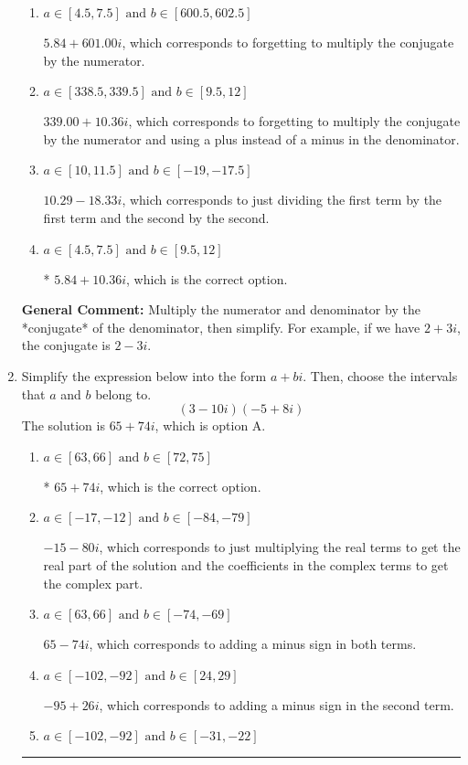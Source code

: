 \documentclass{extbook}[14pt]
\newcommand{\litem}[1]{\item #1

\rule{\textwidth}{0.4pt}}
\begin{document}
\begin{enumerate}
{\begin{enumerate}[label=\Alph*.]
 $11.53  + 2.91 i$, which corresponds to forgetting to multiply the conjugate by the numerator and not computing the conjugate correctly.
\item \( a \in [4.5, 7.5] \text{ and } b \in [600.5, 602.5] \)

 $5.84  + 601.00 i$, which corresponds to forgetting to multiply the conjugate by the numerator.
\item \( a \in [338.5, 339.5] \text{ and } b \in [9.5, 12] \)

 $339.00  + 10.36 i$, which corresponds to forgetting to multiply the conjugate by the numerator and using a plus instead of a minus in the denominator.
\item \( a \in [10, 11.5] \text{ and } b \in [-19, -17.5] \)

 $10.29  - 18.33 i$, which corresponds to just dividing the first term by the first term and the second by the second.
\item \( a \in [4.5, 7.5] \text{ and } b \in [9.5, 12] \)

* $5.84  + 10.36 i$, which is the correct option.
\end{enumerate}

\textbf{General Comment:} Multiply the numerator and denominator by the *conjugate* of the denominator, then simplify. For example, if we have $2+3i$, the conjugate is $2-3i$.
}
\litem{
Simplify the expression below into the form $a+bi$. Then, choose the intervals that $a$ and $b$ belong to.
\[ (3 - 10 i)(-5 + 8 i) \]The solution is \( 65 + 74 i \), which is option A.\begin{enumerate}[label=\Alph*.]
\item \( a \in [63, 66] \text{ and } b \in [72, 75] \)

* $65 + 74 i$, which is the correct option.
\item \( a \in [-17, -12] \text{ and } b \in [-84, -79] \)

 $-15 - 80 i$, which corresponds to just multiplying the real terms to get the real part of the solution and the coefficients in the complex terms to get the complex part.
\item \( a \in [63, 66] \text{ and } b \in [-74, -69] \)

 $65 - 74 i$, which corresponds to adding a minus sign in both terms.
\item \( a \in [-102, -92] \text{ and } b \in [24, 29] \)

 $-95 + 26 i$, which corresponds to adding a minus sign in the second term.
\item \( a \in [-102, -92] \text{ and } b \in [-31, -22] \)


\end{enumerate}}
\end{enumerate}
\end{document}
